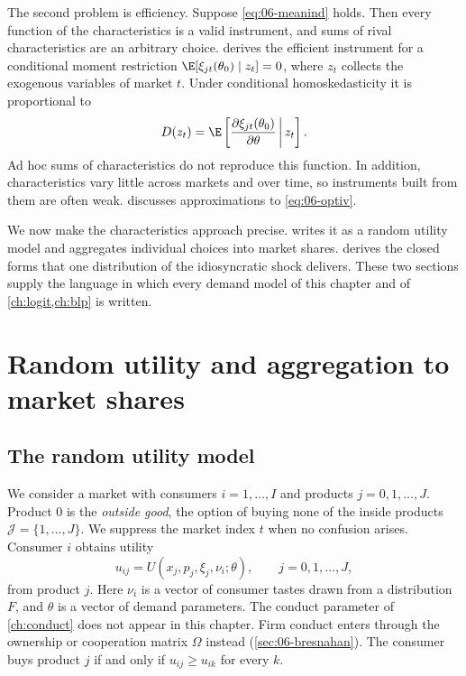 The second problem is efficiency. Suppose \eqref{eq:06-meanind} holds. Then every function of the
characteristics is a valid instrument, and sums of rival characteristics are an arbitrary choice.
\citet{Chamberlain1987} derives the efficient instrument for a conditional moment restriction
$\E[\xi_{jt}(\theta_0) \mid z_t] = 0$, where $z_t$ collects the exogenous variables of market $t$. Under
conditional homoskedasticity it is proportional to
\begin{equation}\label{eq:06-optiv}
D(z_t) = \E\left[\frac{\partial \xi_{jt}(\theta_0)}{\partial \theta} \,\middle|\, z_t\right].
\end{equation}
Ad hoc sums of characteristics do not reproduce this function. In addition, characteristics vary little
across markets and over time, so instruments built from them are often weak.  discusses
approximations to \eqref{eq:06-optiv}.

We now make the characteristics approach precise.  writes it as a random utility model and
aggregates individual choices into market shares.  derives the closed forms that one
distribution of the idiosyncratic shock delivers. These two sections supply the language in which every
demand model of this chapter and of \cref{ch:logit,ch:blp} is written.

\section{Random utility and aggregation to market shares}\label{sec:06-rum}

\subsection{The random utility model}\label{sec:06-rum-setup}

We consider a market with consumers $i = 1, \dots, I$ and products $j = 0, 1, \dots, J$. Product $0$ is the
\emph{outside good}, the option of buying none of the inside products $\mathcal{J} = \{1, \dots, J\}$. We
suppress the market index $t$ when no confusion arises. Consumer $i$ obtains utility
\begin{equation}\label{eq:06-utility}
u_{ij} = U(x_j, p_j, \xi_j, \nu_i; \theta), \qquad j = 0, 1, \dots, J,
\end{equation}
from product $j$. Here $\nu_i$ is a vector of consumer tastes drawn from a distribution $F$, and $\theta$ is a
vector of demand parameters. The conduct parameter of \cref{ch:conduct} does not appear in this chapter. Firm
conduct enters through the ownership or cooperation matrix $\Omega$ instead (\cref{sec:06-bresnahan}). The
consumer buys product $j$ if and only if $u_{ij} \ge u_{ik}$ for every $k$.

